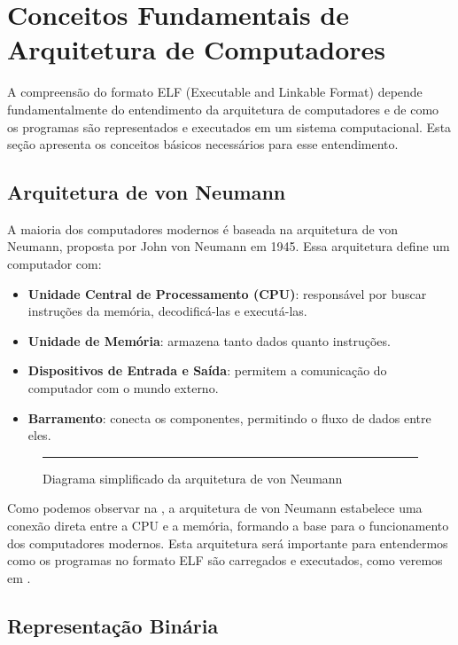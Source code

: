 \section{Conceitos Fundamentais de Arquitetura de Computadores}\label{sec:comp_concepts}

A compreensão do formato ELF (Executable and Linkable Format) depende fundamentalmente do entendimento da arquitetura de computadores e de como os programas são representados e executados em um sistema computacional. Esta seção apresenta os conceitos básicos necessários para esse entendimento.

\subsection{Arquitetura de von Neumann}\label{subsec:von_neumann}

A maioria dos computadores modernos é baseada na arquitetura de von Neumann, proposta por John von Neumann em 1945. Essa arquitetura define um computador com:

\begin{itemize}
    \item \textbf{Unidade Central de Processamento (CPU)}: responsável por buscar instruções da memória, decodificá-las e executá-las.
    \item \textbf{Unidade de Memória}: armazena tanto dados quanto instruções.
    \item \textbf{Dispositivos de Entrada e Saída}: permitem a comunicação do computador com o mundo externo.
    \item \textbf{Barramento}: conecta os componentes, permitindo o fluxo de dados entre eles.
\end{itemize}

\begin{figure}[ht]
    \centering
    \rule{8cm}{5cm} %
    \caption{Diagrama simplificado da arquitetura de von Neumann}
    \label{fig:von_neumann}
\end{figure}

Como podemos observar na , a arquitetura de von Neumann estabelece uma conexão direta entre a CPU e a memória, formando a base para o funcionamento dos computadores modernos. Esta arquitetura será importante para entendermos como os programas no formato ELF são carregados e executados, como veremos em .

\subsection{Representação Binária}\label{subsec:binary}

